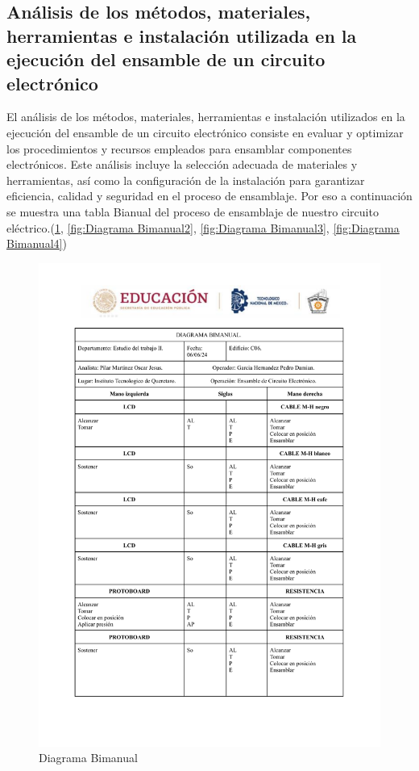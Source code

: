     \subsection{Análisis de los métodos, materiales, herramientas e instalación utilizada en la ejecución del ensamble de un circuito electrónico}
    El análisis de los métodos, materiales, herramientas e instalación utilizados en la ejecución del ensamble de un circuito electrónico consiste en evaluar y optimizar los procedimientos y recursos empleados para ensamblar componentes electrónicos. Este análisis incluye la selección adecuada de materiales y herramientas, así como la configuración de la instalación para garantizar eficiencia, calidad y seguridad en el proceso de ensamblaje. Por eso a continuación se muestra una tabla Bianual del proceso de ensamblaje de nuestro circuito eléctrico.(\ref{fig:Diagrama Bimanual}, \ref{fig:Diagrama Bimanual2}, \ref{fig:Diagrama Bimanual3}, \ref{fig:Diagrama Bimanual4}) 
    \begin{figure}
        \centering
        \includegraphics[trim = {5mm 5mm 5mm 10mm},clip,scale=0.30]{24/Img/diagramaBimanual1.pdf}
        \caption{Diagrama Bimanual}
        \label{fig:Diagrama Bimanual}
    \end{figure}
